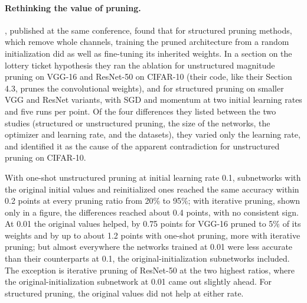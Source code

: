 \begin{refsection}
\paragraph{Rethinking the value of pruning.} \Textcite{LiuEtAl2019}, published at the same conference, found that for structured pruning methods, which remove whole channels, training the pruned architecture from a random initialization did as well as fine-tuning its inherited weights. In a section on the lottery ticket hypothesis they ran the ablation for unstructured magnitude pruning on VGG-16 and ResNet-50 on CIFAR-10 (their code, like their Section 4.3, prunes the convolutional weights), and for structured pruning on smaller VGG and ResNet variants, with SGD and momentum at two initial learning rates and five runs per point. Of the four differences they listed between the two studies (structured or unstructured pruning, the size of the networks, the optimizer and learning rate, and the datasets), they varied only the learning rate, and identified it as the cause of the apparent contradiction for unstructured pruning on CIFAR-10.

\begin{finding}\label{fd:ablations:liu}
With one-shot unstructured pruning at initial learning rate 0.1, subnetworks with the original initial values and reinitialized ones reached the same accuracy within 0.2 points at every pruning ratio from 20\% to 95\%; with iterative pruning, shown only in a figure, the differences reached about 0.4 points, with no consistent sign. At 0.01 the original values helped, by 0.75 points for VGG-16 pruned to 5\% of its weights and by up to about 1.2 points with one-shot pruning, more with iterative pruning; but almost everywhere the networks trained at 0.01 were less accurate than their counterparts at 0.1, the original-initialization subnetworks included. The exception is iterative pruning of ResNet-50 at the two highest ratios, where the original-initialization subnetwork at 0.01 came out slightly ahead. For structured pruning, the original values did not help at either rate.
\end{finding}


\end{refsection}

